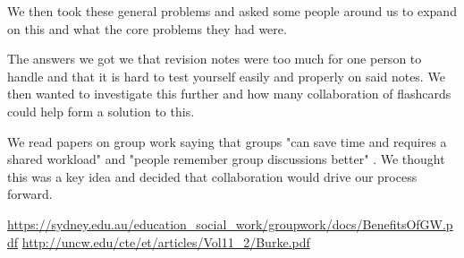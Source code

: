 \documentclass{article}
\begin{document}
We then took these general problems and asked some people around us to expand on this and what the core problems they had were.

The answers we got we that revision notes were too much for one person to handle and that it is hard to test yourself easily and properly on said notes.
We then wanted to investigate this further and how many collaboration of flashcards could help form a solution to this.

We read papers on group work saying that groups "can save time and requires a shared workload" \cite{groupwork1} and "people remember group discussions better" \cite{groupwork2}. We thought this was a key idea and decided that collaboration would drive our process forward.


\begin{thebibliography}{2}
		\url{https://sydney.edu.au/education_social_work/groupwork/docs/BenefitsOfGW.pdf}
		\url{http://uncw.edu/cte/et/articles/Vol11_2/Burke.pdf}
\end{thebibliography}
\end{document}
